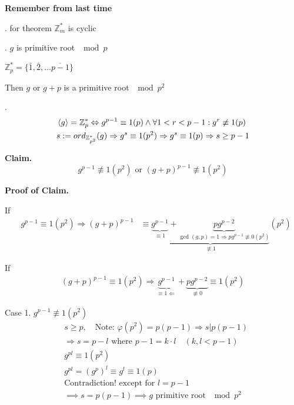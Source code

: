 

\textbf{Remember from last time}

\Proof.
for theorem $\mathbb{Z}_m^{*}$ is cyclic

\Lemma. $g$ is primitive root $\mod p$

$\mathbb{Z}_p^{*} = \{\bar{1}, \bar{2}, \ldots \overline{p-1}\}$

Then $g$ or $g+p$ is a primitive root $\mod p^2$

\Proof.
\begin{align*}
  &\left\langle g \right\rangle = \mathbb{Z}_p^{*} \Leftrightarrow g^{p-1} \equiv 1 (p) \land \forall 1 < r < p-1 : g^r \not\equiv 1(p) \\
  &s : = ord_{\mathbb{Z}_{p^2}^{*}} (g) \Rightarrow g^s \equiv 1 (p^2) \Rightarrow g^s \equiv 1 (p) \Rightarrow s \geq p-1
\end{align*}

\textbf{Claim.}
\[
  g^{p-1} \not\equiv 1 (p^2) \text{ or } (g+p)^{p-1} \not\equiv 1(p^2)
\]

\textbf{Proof of Claim.}

If
\begin{align*}
  &g^{p-1} \equiv 1(p^2) \Rightarrow (g+p)^{p-1}
  &\equiv \underbrace{\underbrace{g^{p-1}}_{\equiv 1} + \underbrace{pg^{p-2}}_{\gcd(g,p) = 1 \Rightarrow pg^{p-1}\not\equiv 0 (p^2)}}_{\not\equiv 1} (p^2)
\end{align*}

If
\begin{align*}
  (g+p)^{p-1} \equiv 1(p^2) \Rightarrow \underbrace{g^{p-1}}_{\equiv 1 \Leftarrow} + \underbrace{pg^{p-2}}_{\not\equiv 0} \equiv 1 (p^2)
\end{align*}

Case 1. $g^{p-1} \not\equiv 1 (p^2)$
\begin{align*}
  &s \geq p, \quad\text{Note: } \varphi(p^2) = p(p-1) \Rightarrow s|p(p-1) \\
  &\Rightarrow s = p-l \text{ where } p-1 = k\cdot l \quad (k,l < p-1) \\
  &g^{pl} \equiv 1 (p^2) \\
  &g^{pl} = (g^p)^l \equiv g^l \equiv 1 (p) \\
  &\text{Contradiction! except for } l = p-1 \\
  &\implies s = p(p-1) \implies g \text{ primitive root } \mod p^2
\end{align*}

